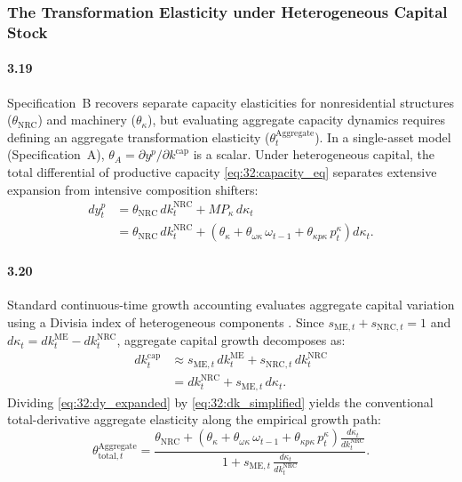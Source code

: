 \subsubsection{The Transformation Elasticity under Heterogeneous Capital Stock}

\paragraph{3.19}
Specification~B recovers separate capacity elasticities for nonresidential structures ($\theta_{\text{NRC}}$) and machinery ($\theta_\kappa$), but evaluating aggregate capacity dynamics requires defining an aggregate transformation elasticity ($\theta^{\text{Aggregate}}_t$). In a single-asset model (Specification~A), $\theta_A = \partial y^p / \partial k^{\text{cap}}$ is a scalar. Under heterogeneous capital, the total differential of productive capacity \eqref{eq:32:capacity_eq} separates extensive expansion from intensive composition shifters:
\begin{align}
	dy^p_t &= \theta_{\text{NRC}}\, dk^{\text{NRC}}_t + MP_\kappa\, d\kappa_t
	\label{eq:32:dy_total} \\
	&= \theta_{\text{NRC}}\, dk^{\text{NRC}}_t
	+ \left(\theta_\kappa + \theta_{\omega\kappa}\, \omega_{t-1}
	+ \theta_{\kappa p\kappa}\, p^\kappa_t\right) d\kappa_t.
	\label{eq:32:dy_expanded}
\end{align}

\paragraph{3.20}
Standard continuous-time growth accounting evaluates aggregate capital variation using a Divisia index of heterogeneous components \citep{Divisia1925}. Since $s_{\text{ME},t} + s_{\text{NRC},t} = 1$ and $d\kappa_t = dk^{\text{ME}}_t - dk^{\text{NRC}}_t$, aggregate capital growth decomposes as:
\begin{align}
	dk^{\text{cap}}_t &\approx s_{\text{ME},t}\, dk^{\text{ME}}_t
	+ s_{\text{NRC},t}\, dk^{\text{NRC}}_t
	\label{eq:32:dk_divisia} \\
	&= dk^{\text{NRC}}_t + s_{\text{ME},t}\, d\kappa_t.
	\label{eq:32:dk_simplified}
\end{align}
Dividing \eqref{eq:32:dy_expanded} by \eqref{eq:32:dk_simplified} yields the conventional total-derivative aggregate elasticity along the empirical growth path:
\begin{equation}
	\theta^{\text{Aggregate}}_{\text{total},t}
	= \frac{\theta_{\text{NRC}}
		+ \left(\theta_\kappa + \theta_{\omega\kappa}\, \omega_{t-1}
		+ \theta_{\kappa p\kappa}\, p^\kappa_t\right)
		\frac{d\kappa_t}{dk^{\text{NRC}}_t}}
	{1 + s_{\text{ME},t}\, \frac{d\kappa_t}{dk^{\text{NRC}}_t}}.
	\label{eq:32:theta_aggregate}
\end{equation}

